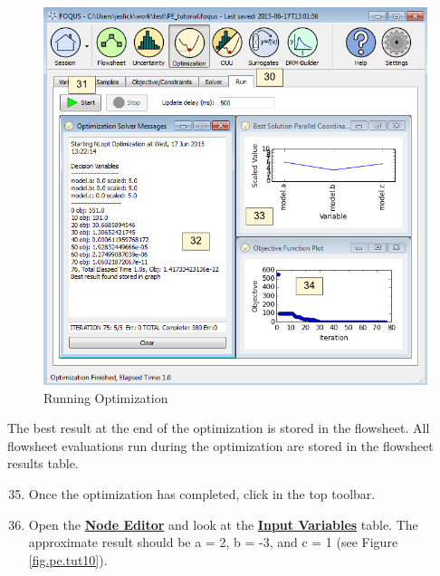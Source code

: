 \begin{figure}[H]
	\begin{center}
		\includegraphics[scale=0.55]{Chapt_optimization/figs/par_est_tut9}
		\caption{Running Optimization}
		\label{fig.pe.tut9}
	\end{center}
\end{figure}

The best result at the end of the optimization is stored in the flowsheet. All flowsheet evaluations run during the optimization are stored in the flowsheet results table.

\begin{enumerate}
	\setcounter{enumi}{34}
	\item Once the optimization has completed, click  in the top toolbar.
	\item Open the \textbf{\underline{Node Editor}} and look at the \textbf{\underline{Input Variables}} table. The approximate result should be a = 2, b = -3, and c = 1  (see Figure \ref{fig.pe.tut10}).
\end{enumerate}
	
